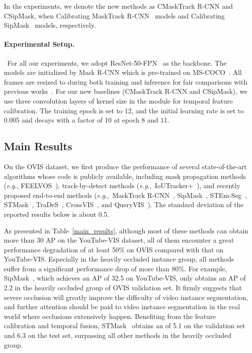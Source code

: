 \documentclass[twocolumn]{svjour3}          \smartqed  \usepackage{graphicx}
\newcommand{\eg}{\textit{e}.\textit{g}.}
\def\myTextColor{\textcolor[rgb]{0, 0, 0}}
\begin{document}
\begin{sloppypar}
In the experiments, we denote the new methods as CMaskTrack R-CNN and CSipMask, when Calibrating MaskTrack R-CNN~\cite{youtube_vis} models and Calibrating SipMask~\cite{sipmask} models, respectively.


\paragraph{Experimental Setup.}~For all our experiments, we adopt ResNet-50-FPN~\cite{resnet} as the backbone. The models are initialized by Mask R-CNN which is pre-trained on MS-COCO~\cite{coco}. All frames are resized to  during both training and inference for fair comparisons with previous works~\cite{youtube_vis,sipmask,stem_seg}.
For our new baselines (CMaskTrack R-CNN and CSipMask), we use three convolution layers of kernel size  in the module for temporal feature calibration. The training epoch is set to 12, and the initial learning rate is set to 0.005 and decays with a factor of 10 at epoch 8 and 11.

\subsection{Main Results}

On the OVIS dataset, we first produce the performance of several state-of-the-art algorithms whose code is publicly available, including mask propagation methods (\eg, FEELVOS~\cite{feelvos}), track-by-detect methods (\eg,~IoUTracker+~\cite{youtube_vis}), and recently proposed end-to-end methods (\eg,~MaskTrack R-CNN~\cite{youtube_vis}, SipMask~\cite{sipmask}, STEm-Seg~\cite{stem_seg}, STMask~\cite{stmask}, TraDeS~\cite{trades}, CrossVIS~\cite{crossvis}, and QueryVIS~\cite{queryinst}). \myTextColor{The standard deviation of the reported results below is about 0.5.}

As presented in Table~\ref{main_results}, although most of these methods can obtain more than 30 AP on the YouTube-VIS dataset, all of them encounter a great performance degradation of at least 50\% on OVIS compared with that on YouTube-VIS. Especially in the heavily occluded instance group, all methods suffer from a significant performance drop of more than 80\%. For example, SipMask~\cite{sipmask}, which achieves an AP of 32.5 on YouTube-VIS, only obtains an AP of 2.2 in the heavily occluded group of OVIS validation set. It firmly suggests that severe occlusion will greatly improve the difficulty of video instance segmentation, and further attention should be paid to video instance segmentation in the real world where occlusions extensively happen.
Benefiting from the feature calibration and temporal fusion, STMask~\cite{stmask} obtains an  of 5.1 on the validation set and 6.3 on the test set, surpassing all other methods in the heavily occluded group.


\end{sloppypar}
\end{document}
